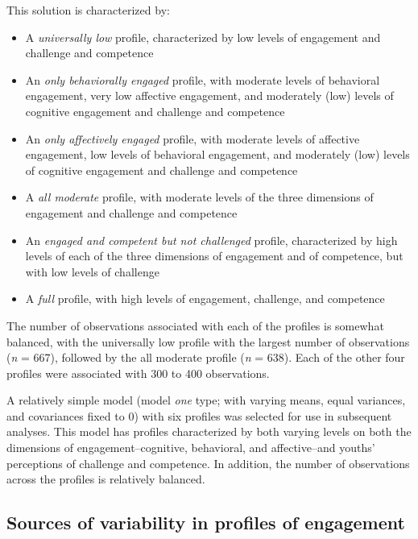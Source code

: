 \documentclass[]{book}
\providecommand{\tightlist}{%
  \setlength{\itemsep}{0pt}\setlength{\parskip}{0pt}}
\theoremstyle{definition}
\theoremstyle{definition}
\theoremstyle{definition}
\theoremstyle{remark}
\begin{document}
This solution is characterized by:

\begin{itemize}
\tightlist
\item
  A \emph{universally low} profile, characterized by low levels of
  engagement and challenge and competence
\item
  An \emph{only behaviorally engaged} profile, with moderate levels of
  behavioral engagement, very low affective engagement, and moderately
  (low) levels of cognitive engagement and challenge and competence
\item
  An \emph{only affectively engaged} profile, with moderate levels of
  affective engagement, low levels of behavioral engagement, and
  moderately (low) levels of cognitive engagement and challenge and
  competence
\item
  A \emph{all moderate} profile, with moderate levels of the three
  dimensions of engagement and challenge and competence
\item
  An \emph{engaged and competent but not challenged} profile,
  characterized by high levels of each of the three dimensions of
  engagement and of competence, but with low levels of challenge
\item
  A \emph{full} profile, with high levels of engagement, challenge, and
  competence
\end{itemize}

The number of observations associated with each of the profiles is
somewhat balanced, with the universally low profile with the largest
number of observations (\emph{n} = 667), followed by the all moderate
profile (\emph{n} = 638). Each of the other four profiles were
associated with 300 to 400 observations.

A relatively simple model (model \emph{one} type; with varying means,
equal variances, and covariances fixed to 0) with six profiles was
selected for use in subsequent analyses. This model has profiles
characterized by both varying levels on both the dimensions of
engagement--cognitive, behavioral, and affective--and youths'
perceptions of challenge and competence. In addition, the number of
observations across the profiles is relatively balanced.

\subsection{Sources of variability in profiles of
engagement}\label{sources-of-variability-in-profiles-of-engagement}
\end{document}
